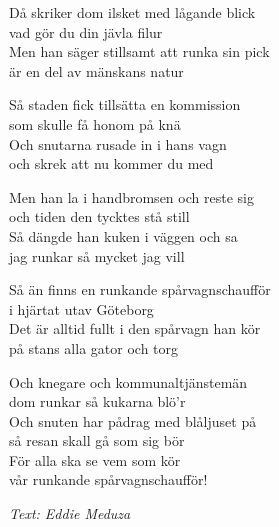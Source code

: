 Då skriker dom ilsket med lågande blick\\
vad gör du din jävla filur\\
Men han säger stillsamt att runka sin pick\\
är en del av mänskans natur\par
\vspace{8pt}
Så staden fick tillsätta en kommission\\
som skulle få honom på knä\\
Och snutarna rusade in i hans vagn\\
och skrek att nu kommer du med\par
\vspace{8pt}
Men han la i handbromsen och reste sig\\
och tiden den tycktes stå still\\
Så dängde han kuken i väggen och sa\\
jag runkar så mycket jag vill\par
\vspace{8pt}
Så än finns en runkande spårvagnschaufför\\
i hjärtat utav Göteborg\\
Det är alltid fullt i den spårvagn han kör\\
på stans alla gator och torg\par
\vspace{8pt}
Och knegare och kommunaltjänstemän\\
dom runkar så kukarna blö’r \\
Och snuten har pådrag med blåljuset på\\
så resan skall gå som sig bör\\
För alla ska se vem som kör\\
vår runkande spårvagnschaufför!\par
\vspace{10pt}
{\footnotesize\textit{Text: Eddie Meduza}}
